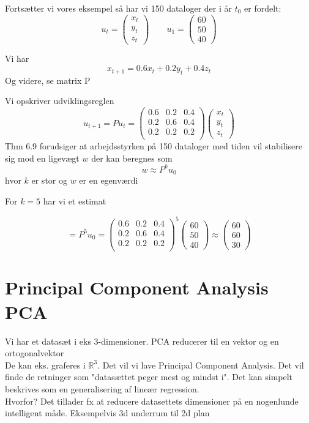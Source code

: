 \documentclass[a4paper,fleqn]{report}
\newcommand{\RR}{\mathbb{R}}
\begin{document}
	Fortsætter vi vores eksempel så har vi 150 dataloger der i år $t_0$ er fordelt:
	\[ u_t = \begin{pmatrix}x_t\\y_t\\z_t\end{pmatrix} \qquad u_1 =
	\begin{pmatrix}60\\50\\40\end{pmatrix}\]

	Vi har \[x_{t+1} = 0.6x_t + 0.2y_t + 0.4z_t \] Og videre, se matrix P

	Vi opskriver udviklingsreglen
	\[u_{t+1} = Pu_t = 
		\begin{pmatrix}
			0.6&0.2&0.4\\
			0.2&0.6&0.4\\
			0.2&0.2&0.2\\
		\end{pmatrix}\begin{pmatrix}x_t\\y_t\\z_t\end{pmatrix}
	\]
	Thm 6.9 forudsiger at arbejdsstyrken på 150 dataloger med tiden vil stabilisere sig mod
	en ligevægt $w$ der kan beregnes som 
	\[ w \approx P^ku_0\] hvor $k$ er stor og $w$ er en egenværdi

	For $k = 5$ har vi et estimat

	\[ = P^5u_0 = 
		\begin{pmatrix}
			0.6&0.2&0.4\\
			0.2&0.6&0.4\\
			0.2&0.2&0.2\\
		\end{pmatrix}^5\begin{pmatrix}60\\50\\40\end{pmatrix}
		\approx 
		\begin{pmatrix}60\\60\\30\end{pmatrix}
	\]

	\section{Principal Component Analysis PCA}
	Vi har et datasæt i eks 3-dimensioner. PCA reducerer til en vektor og en ortogonalvektor\\
	De kan eks. graferes i $\RR^3$. Det vil vi lave Principal Component Analysis. Det vil finde
	de retninger som "datasættet peger mest og mindst i". Det kan simpelt beskrives som
	en generalisering af lineær regression.\\
	Hvorfor? Det tillader fx at reducere datasettets dimensioner på en nogenlunde intelligent
	måde. Eksempelvis 3d underrum til 2d plan\\
\end{document}
